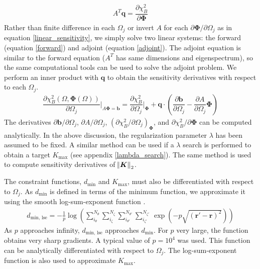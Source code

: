 \documentclass[aps,unsortedaddress]{revtex4-1}
\newcommand{\partder}[2]{\dfrac{\partial  #1}{\partial  #2}}
\begin{document}
\begin{gather}
A^T \bm{q} = \partder{\chi^2_B}{\bm{\Phi}}
\label{adjoint}
\end{gather}
Rather than finite difference in each $\Omega_j$ or invert $A$ for each $\partial \bm{\Phi}/\partial \Omega_j$ as in equation \ref{linear_sensitivity}, we simply solve two linear systems: the forward (equation \ref{forward}) and adjoint (equation \ref{adjoint}). The adjoint equation is similar to the forward equation ($A^T$ has same dimensions and eigenspectrum), so the same computational tools can be used to solve the adjoint problem. We perform an inner product with $\bm{q}$ to obtain the sensitivity derivatives with respect to each $\Omega_j$. 
\begin{gather}
\partder{\chi^2_B(\Omega, \bm{\Phi}(\Omega))}{\Omega_j} \bigg \rvert_{A \bm{\Phi} = \bm{b}} = \partder{\chi^2_B}{\Omega_j} \bigg \rvert_{\bm{\Phi}} + \bm{q} \cdot \left( \partder{\bm{b}}{\Omega_j} - \partder{A}{\Omega_j} \bm{\Phi} \right)
\label{adjointsensitivity}
\end{gather}
The derivatives $\partial \bm{b}/\partial \Omega_j$, $\partial A/\partial \Omega_j$, $\left( \partial \chi^2_B/\partial \Omega_j \right)_{\bm{\Phi}}$, and $\partial \chi^2_B/\partial \bm{\Phi}$ can be computed analytically. In the above discussion, the regularization parameter $\lambda$ has been assumed to be fixed. A similar method can be used if a $\lambda$ search is performed to obtain a target $K_{\text{max}}$ (see appendix \ref{lambda_search}). The same method is used to compute sensitivity derivatives of $\norm{\bm{K}}_2$. 

The constraint functions, $d_{\text{min}}$ and $K_{\text{max}}$, must also be differentiated with respect to $\Omega_j$. As $d_{\text{min}}$ is defined in terms of the minimum function, we approximate it using the smooth log-sum-exponent function \cite{Boyd2004}.
\begin{gather}
d_{\text{min, lse}} = - \frac{1}{p} \log \left( \sum_{i_{\theta}}^{N_{\theta}} \sum_{i_{\zeta}}^{N_{\zeta}} \sum_{i_{\theta'}}^{N_{\theta'}} \sum_{i_{\zeta'}}^{N_{\zeta'}} \, \exp \left( - p \sqrt{(\bm{r}' - \bm{r})^2} \right) \right)
\label{lse_d}
\end{gather}
As $p$ approaches infinity, $d_{\text{min, lse}}$ approaches $d_{\text{min}}$. For $p$ very large, the function obtains very sharp gradients. A typical value of $p = 10^4$ was used. This function can be analytically differentiated with respect to $\Omega_j$. The log-sum-exponent function is also used to approximate $K_{\text{max}}$. 
\end{document}
